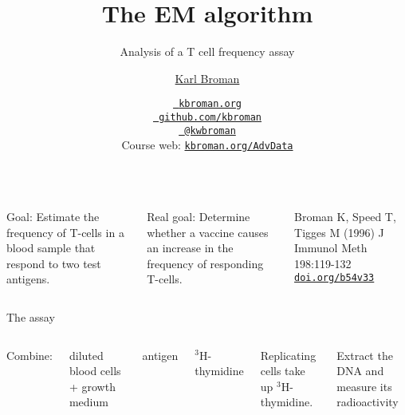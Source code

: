 \documentclass[aspectratio=169,12pt,t]{beamer}
\title{The EM algorithm}
\subtitle{Analysis of a T cell frequency assay}
\author{\href{https://kbroman.org}{Karl Broman}}
\institute{Biostatistics \& Medical Informatics \\ UW{\textendash}Madison}
\date{\href{https://kbroman.org}{\tt \scriptsize \color{foreground} kbroman.org}
\\[-4pt]
\href{https://github.com/kbroman}{\tt \scriptsize \color{foreground} github.com/kbroman}
\\[-4pt]
\href{https://twitter.com/kwbroman}{\tt \scriptsize \color{foreground} @kwbroman}
\\[-4pt]
{\scriptsize Course web: \href{https://kbroman.org/AdvData}{\tt kbroman.org/AdvData}}
}
\begin{document}
{
\frame{
  \titlepage

  \note{}

} }


\begin{frame}[c]{}

  \begin{columns}[c]
    \fontsize{10pt}{11}\selectfont
      \bbi
      \item[\hilit Goal:] Estimate the frequency of T-cells in a blood
        sample that respond to two test antigens.

      \item[\hilit Real goal:] Determine whether a vaccine causes an
        increase in the frequency of responding T-cells.
      \ei

      \vspace{10mm}

      \hspace*{-0.2\textwidth} {\fontsize{6pt}{6}\selectfont Broman K, Speed T, Tigges M (1996)
        J Immunol Meth 198:119-132
        \href{https://doi.org/b54v33}{\tt doi.org/b54v33}}



  \end{columns}


\end{frame}



\begin{frame}[c]{The assay}

  \begin{columns}[c]
    \fontsize{10pt}{11}\selectfont

    \bbi
  \item Combine:
    \bi
  \item diluted blood cells + growth medium
  \item antigen
  \item $^{\text{3}}$H-thymidine
    \ei

    \item Replicating cells take up $^{\text{3}}$H-thymidine.

    \item Extract the DNA and measure its radioactivity
      \ei


  \end{columns}

\end{frame}
\end{document}
